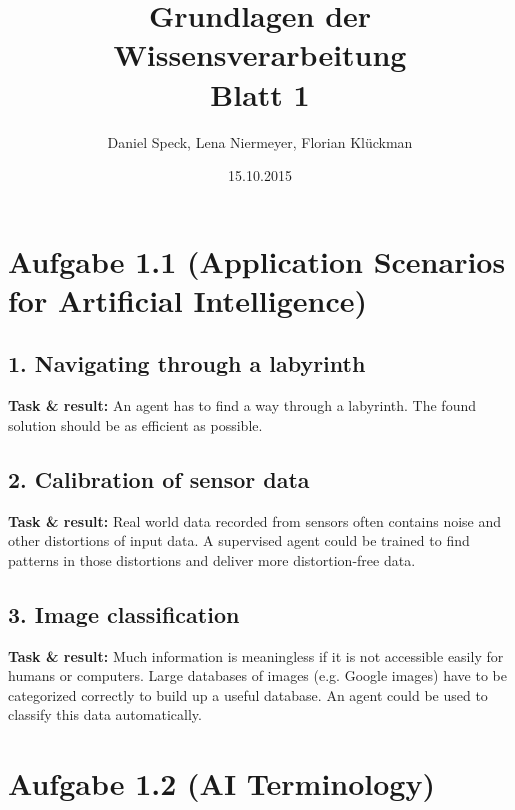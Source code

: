 \documentclass[10pt,a4paper]{article}
\title{\textbf{\huge Grundlagen der Wissensverarbeitung
\\\Large Blatt 1}}
\author{Daniel Speck, Lena Niermeyer, Florian Klückman}
\date{15.10.2015}
\begin{document}
	\maketitle




	\section*{Aufgabe 1.1 (Application Scenarios for Artificial Intelligence)}
	
		\subsection*{1. Navigating through a labyrinth}
		
			\textbf{Task \& result:} An agent has to find a way through a labyrinth. The found solution should be as efficient as possible.
		
		\subsection*{2. Calibration of sensor data}
		
			\textbf{Task \& result:} Real world data recorded from sensors often contains noise and other distortions of input data. A supervised agent could be trained to find patterns in those distortions and deliver more distortion-free data.
		
		\subsection*{3. Image classification}
		
			\textbf{Task \& result:} Much information is meaningless if it is not accessible easily for humans or computers. Large databases of images (e.g. Google images) have to be categorized correctly to build up a useful database. An agent could be used to classify this data automatically.
	
	\section*{Aufgabe 1.2 (AI Terminology)}


		
\end{document}
